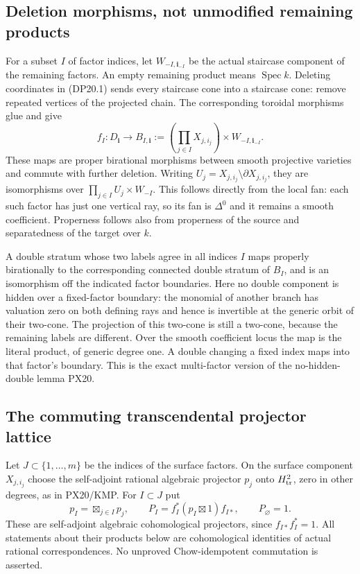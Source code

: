 \subsection{Deletion morphisms, not unmodified remaining products}

For a subset $I$ of factor indices, let $W_{-I,\mathbf i_{-I}}$
be the actual staircase component of the remaining factors.
An empty remaining product means $\operatorname{Spec}k$.
Deleting coordinates in (DP20.1) sends every staircase cone into
a staircase cone: remove repeated vertices of the projected
chain. The corresponding toroidal morphisms glue and give
\[
 f_I:D_{\mathbf i}\longrightarrow
 B_{I,\mathbf i}:=
       \left(\prod_{j\in I}X_{j,i_j}\right)
                     \times W_{-I,\mathbf i_{-I}}.
 \tag{DP20.3}
\]
These maps are proper birational morphisms between smooth
projective varieties and commute with further deletion.
Writing $U_j=X_{j,i_j}\setminus\partial X_{j,i_j}$, they are
isomorphisms over
$\prod_{j\in I}U_j\times W_{-I}$. This follows directly from
the local fan: each such factor has just one vertical ray,
so its fan is $\Delta^0$ and it remains a smooth coefficient.
Properness follows also from properness of the source and
separatedness of the target over $k$.

A double stratum whose two labels agree in all indices $I$ maps
properly birationally to the corresponding connected double
stratum of $B_I$, and is an isomorphism off the indicated factor
boundaries. Here no double component is hidden over a fixed-factor
boundary: the monomial of another branch has valuation zero on
both defining rays and hence is invertible at the generic orbit
of their two-cone. The projection of this two-cone is still a
two-cone, because the remaining labels are different. Over the
smooth coefficient locus the map is the literal product, of
generic degree one. A double changing a fixed index maps into
that factor's boundary. This is the exact multi-factor version
of the no-hidden-double lemma PX20.

\subsection{The commuting transcendental projector lattice}

Let $J\subset\{1,\ldots,m\}$ be the indices of the surface
factors. On the surface component $X_{j,i_j}$ choose the
self-adjoint rational algebraic projector $p_j$ onto
$H^2_{\rm tr}$, zero in other degrees, as in PX20/KMP.
For $I\subset J$ put
\[
 p_I=\boxtimes_{j\in I}p_j,\qquad
 P_I=f_I^*(p_I\boxtimes1)f_{I*},\qquad P_{\varnothing}=1.
 \tag{DP20.4}
\]
These are self-adjoint algebraic cohomological projectors, since
$f_{I*}f_I^*=1$. All statements about their products below are
cohomological identities of actual rational correspondences.
No unproved Chow-idempotent commutation is asserted.

